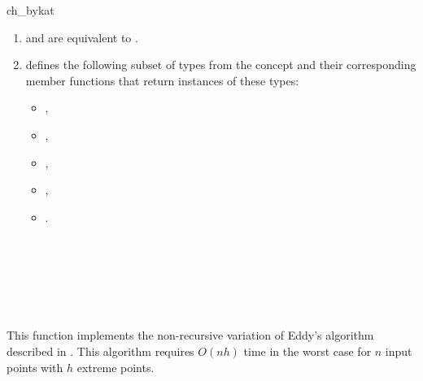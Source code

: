 \begin{ccRefFunction}{ch_bykat}
\begin{enumerate}
   \item    {} and 
            are equivalent to .
   \item    {} defines the following subset of types from
            the concept  and their corresponding member
            functions that return instances of these types:
            \begin{itemize}
                \item {},
                \item {},
                \item {}, 
                \item {},
		\item {}.
            \end{itemize}
\end{enumerate}

\ccSeeAlso

 \\
 \\
 \\
 \\
 \\

\ccImplementation
This function implements the non-recursive variation of
Eddy's algorithm \cite{e-nchap-77} described in \cite{b-chfsp-78}.
This algorithm requires $O(n h)$ time 
in the worst case for $n$ input points with $h$ extreme points.  

\end{ccRefFunction}



